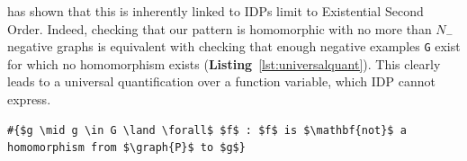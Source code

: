 
\citep{conf/fsttcs/Immerman98} has shown that this is inherently linked to IDPs limit to Existential Second Order.
Indeed, checking that our pattern  is homomorphic with no more than $N_{-}$ negative graphs is equivalent with checking that enough negative examples \lstinline{G} exist for which  no homomorphism exists (\textbf{Listing}~\ref{lst:universalquant}). This clearly leads to a universal quantification over a function variable, which IDP cannot express.

\vspace{-1.25em}
\begin{center}
\begin{minipage}{0.75\linewidth}
\begin{lstlisting}[style=small,mathescape, caption=Quantifying over functions outside the vocabulary, label=lst:universalquant]
#{$g \mid g \in G \land \forall$ $f$ : $f$ is $\mathbf{not}$ a homomorphism from $\graph{P}$ to $g$}
\end{lstlisting}
\end{minipage}
\end{center}
\vspace{-0.5em}

